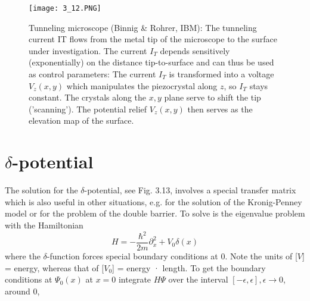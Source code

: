 \begin{figure}[ht]
    \centering
    \texttt{[image: 3\_12.PNG]}
    \caption{Tunneling microscope (Binnig \& Rohrer, IBM): The tunneling current IT flows from the metal tip of the microscope to the surface under investigation. The current $I_T$ depends sensitively (exponentially) on the distance tip-to-surface and can thus be used as control parameters: The current $I_T$ is transformed into a voltage $V_z (x, y)$ which manipulates the piezocrystal along $z$, so $I_T$ stays constant. The crystals along the $x, y$ plane serve to shift the tip ('scanning'). The potential relief $V_z (x, y)$ then serves as the elevation map of the surface.}
\end{figure}
\section{$\delta$-potential}
The solution for the $\delta$-potential, see Fig. 3.13, involves a special transfer matrix which is also useful in other situations, e.g. for the solution of the Kronig-Penney model or for the problem of the double barrier. To solve is the eigenvalue problem with the Hamiltonian
\begin{equation}
    H=-\frac{\hbar^{2}}{2 m} \partial_{x}^{2}+V_{0} \delta(x)
    \end{equation}
where the $\delta$-function forces special boundary conditions at 0. Note the units of [$V$] = energy, whereas that of [$V_0$] = energy · length. To get the boundary conditions at $\Psi_0 (x)$ at $x = 0$
integrate $H\Psi$ over the interval $[-\epsilon, \epsilon], \epsilon\to 0$, around 0,

